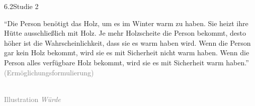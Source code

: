 \documentclass[xcolor=table,9pt,aspectratio=169]{beamer}
\begin{document}
\begin{frame}{\vspace*{10mm}6.2\hspace*{1em}Studie 2}
\begin{multicols}{2}
   \enquote{Die Person benötigt das Holz, um es im Winter warm zu haben. Sie heizt ihre Hütte ausschließlich mit Holz. Je mehr Holzscheite die Person bekommt, desto höher ist die Wahrscheinlichkeit, dass sie es warm haben wird. Wenn die Person gar kein Holz bekommt, wird sie es mit Sicherheit nicht warm haben. Wenn die Person alles verfügbare Holz bekommt, wird sie es mit Sicherheit warm haben.}\\
   \medskip
   \textcolor{gray}{(Ermöglichungsformulierung)}
   \vfill
   \begin{center}
      \\
      \textcolor{gray}{Illustration \textit{Würde}}
   \end{center}
\end{multicols}
\end{frame}
\end{document}
